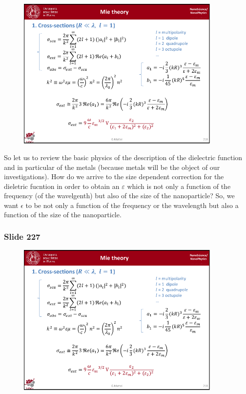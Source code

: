 \documentclass[../main/main.tex]{subfiles}
\begin{document}
\begin{figure}[h!]
\centering
\includegraphics[page=9,width=0.9\textwidth]{../lessons/pdf_file/14_lesson.pdf}
\end{figure}

So let us to review the basic physics of the description of the dielectric function and in particular of the metals (because metals will be the object of our investigations).
How do we arrive to the size dependent correction for the dieletric fucntion in order to obtain an \( \varepsilon  \) which is not only a function of the frequency (of the wavelgenth) but also of the size of the nanoparticle?
So, we want $\epsilon$ to be not only a function of the frequency or the wavelength but also a function of the size of the nanoparticle.


\newpage
\subsubsection{Slide 227}

\begin{figure}[h!]
\centering
\includegraphics[page=10,width=0.9\textwidth]{../lessons/pdf_file/14_lesson.pdf}
\end{figure}
\end{document}
